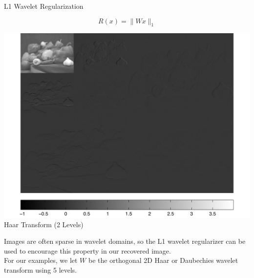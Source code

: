 \documentclass[12pt]{beamer}
\begin{document}
\begin{frame}{L1 Wavelet Regularization}

\vspace{-4ex}
\[ R(x) = \| W x \|_1 \]

\vspace{2ex}
\begin{minipage}[T]{0.45\textwidth}
	\begin{center}
	\includegraphics[width=1\textwidth]{../figures/haarTrans.pdf} \\
	Haar Transform (2 Levels)
	\end{center}
\end{minipage}
\begin{minipage}[T]{0.5\textwidth}
Images are often sparse in wavelet domains, so the L1 wavelet regularizer can be used to encourage this property in our recovered image. \\

For our examples, we let $W$ be the orthogonal 2D Haar or Daubechies wavelet transform using 5 levels. \\[2ex]
\end{minipage}




\end{frame}
\end{document}
